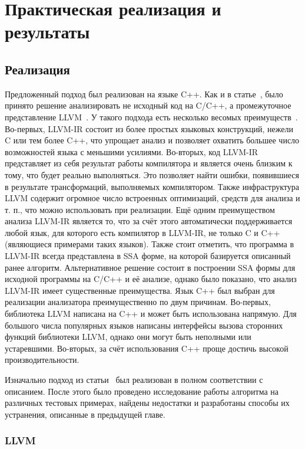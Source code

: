 \chapter{Практическая реализация и результаты}

\section{Реализация}

Предложенный подход был реализован на языке C++.  Как и в
статье~\cite{li2010practical}, было принято решение анализировать не
исходный код на C/C++, а промежуточное представление
LLVM~\cite{lattner2004llvm}. У такого подхода есть несколько весомых
преимуществ~\cite{merz2012llbmc}. Во-первых, LLVM-IR состоит из более
простых языковых конструкций, нежели C или тем более C++, что упрощает
анализ и позволяет охватить большее число возможностей языка с
меньшими усилиями. Во-вторых, код LLVM-IR представляет из себя
результат работы компилятора и является очень близким к тому, что
будет реально выполняться. Это позволяет найти ошибки, появившиеся в
результате трансформаций, выполняемых компилятором. Также
инфраструктура LLVM содержит огромное число встроенных оптимизаций,
средств для анализа и т. п., что можно использовать при
реализации. Ещё одним преимуществом анализа LLVM-IR является то, что
за счёт этого автоматически поддерживается любой язык, для которого
есть компилятор в LLVM-IR, не только C и C++ (являющиеся примерами
таких языков). Также стоит отметить, что программа в LLVM-IR всегда
представлена в SSA форме, на которой базируется описанный ранее
алгоритм. Альтернативное решение состоит в построении SSA формы для
исходной программы на C/C++ и её анализе, однако было показано, что
анализ LLVM-IR имеет существенные преимущества. Язык C++ был выбран
для реализации анализатора преимущественно по двум
причинам. Во-первых, библиотека LLVM написана на C++ и может быть
использована напрямую. Для большого числа популярных языков написаны
интерфейсы вызова сторонних функций библиотеки LLVM, однако они могут
быть неполными или устаревшими. Во-вторых, за счёт использования C++
проще достичь высокой производительности.

Изначально подход из статьи~\cite{li2010practical} был реализован в
полном соответствии с описанием. После этого было проведено
исследование работы алгоритма на различных тестовых примерах, найдены
недостатки и разработаны способы их устранения, описанные в предыдущей
главе.

\subsection{LLVM}

